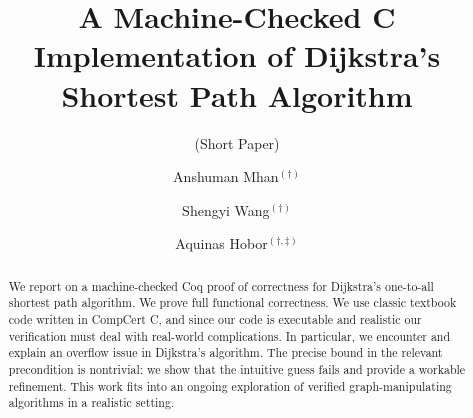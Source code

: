 \documentclass[runningheads]{llncs}
\title{A Machine-Checked C Implementation of Dijkstra's Shortest Path Algorithm}
\subtitle{(Short Paper)}
\begin{document}
\author{Anshuman Mhan$^{(\dagger)}$ \and Shengyi Wang$^{(\dagger)}$ \and Aquinas Hobor$^{(\dagger,\ddagger)}$}

%


\maketitle








\begin{abstract}
\vspace{-1.2em}
We report on a machine-checked Coq proof of correctness for
Dijkstra’s one-to-all shortest path algorithm.
We prove full functional correctness.
We use classic textbook code written in CompCert C, and since our
code is executable and realistic our verification
must deal with real-world complications.
In particular, we encounter and explain an overflow issue in
Dijkstra’s algorithm. The precise bound in the relevant precondition is
nontrivial: we show that the intuitive guess
fails and provide a workable refinement.
This work fits into an ongoing exploration of verified graph-manipulating
algorithms in a realistic setting.

\end{abstract} %
\end{document}
